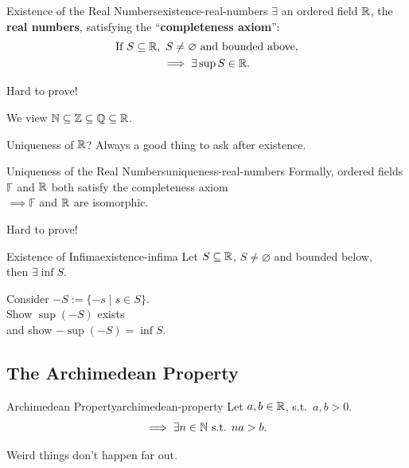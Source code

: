 \begin{theorem}{Existence of the Real Numbers}{existence-real-numbers}
  $\exists$ an ordered field $\mathbb{R}$, the \textbf{real numbers},
  satisfying the ``\textbf{completeness axiom}'':
  \[
    \begin{gathered}
      \text{If }S\subseteq\mathbb{R},\ S\ne\varnothing\text{ and bounded above},\\
      \implies\exists\sup S\in\mathbb{R}.
    \end{gathered}
  \]
\end{theorem}

Hard to prove!

We view $\mathbb{N}\subseteq\mathbb{Z}\subseteq\mathbb{Q}\subseteq\mathbb{R}$.

\begin{thinking}
  Uniqueness of $\mathbb{R}$? Always a good thing to ask after existence.
\end{thinking}

\begin{theorem}{Uniqueness of the Real Numbers}{uniqueness-real-numbers}
  Formally, ordered fields $\mathbb{F}$ and $\mathbb{R}$ both satisfy the completeness axiom\\
  $\implies\mathbb{F}$ and $\mathbb{R}$ are isomorphic.
\end{theorem}

Hard to prove!

\begin{theorem}{Existence of Infima}{existence-infima}
  Let $S\subseteq\mathbb{R}$, $S\ne\varnothing$ and bounded below,\\
  then $\exists\inf S$.
\end{theorem}

\begin{thinking}
  Consider $-S:=\{-s\mid s\in S\}$.\\
  Show $\sup(-S)$ exists\\
  and show $-\sup(-S)=\inf S$.
\end{thinking}

\subsection{The Archimedean Property}

\begin{theorem}{Archimedean Property}{archimedean-property}
  Let $a,b\in\mathbb{R}$, s.t.\ $a,b>0$.
  \[
    \implies\exists n\in\mathbb{N}\text{ s.t. }na>b.
  \]
\end{theorem}

\begin{thinking}
  Weird things don't happen far out.
  \begin{center}
  \end{center}
\end{thinking}

